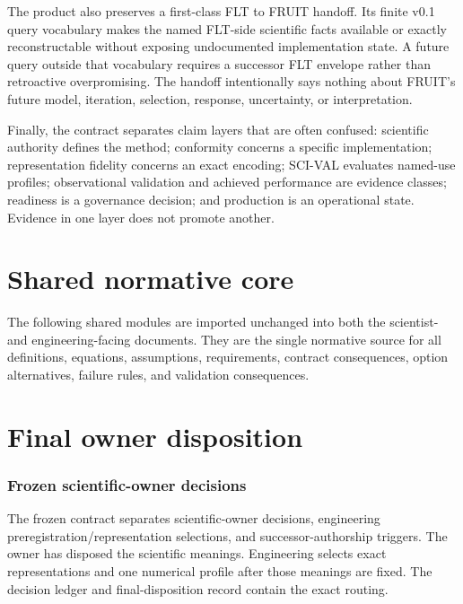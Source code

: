 \documentclass[11pt]{article}
\begin{document}
The product also preserves a first-class FLT to FRUIT handoff. Its finite v0.1
query vocabulary makes the named FLT-side scientific facts available or
exactly reconstructable without exposing undocumented implementation state. A
future query outside that vocabulary requires a successor FLT envelope rather
than retroactive overpromising. The handoff intentionally says nothing about
FRUIT's future model, iteration, selection, response, uncertainty, or
interpretation.

Finally, the contract separates claim layers that are often confused:
scientific authority defines the method; conformity concerns a specific
implementation; representation fidelity concerns an exact encoding; SCI-VAL
evaluates named-use profiles; observational validation and achieved performance
are evidence classes; readiness is a governance decision; and production is
an operational state. Evidence in one layer does not promote another.

\part{Shared normative core}

The following shared modules are imported unchanged into both the scientist- and
engineering-facing documents. They are the single normative source for all
definitions, equations, assumptions, requirements, contract consequences, option
alternatives, failure rules, and validation consequences.








\part{Final owner disposition}

\section{Frozen scientific-owner decisions}

The frozen contract separates scientific-owner decisions, engineering
preregistration/representation selections, and successor-authorship triggers.
The owner has disposed the scientific meanings. Engineering selects
exact representations and one numerical profile after those meanings are
fixed. The decision ledger and final-disposition record contain the exact
routing.
\end{document}
